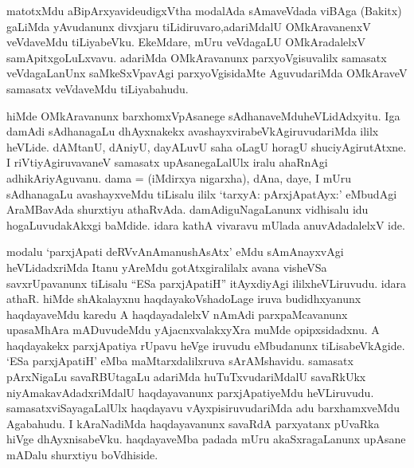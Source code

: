 \begin{artha}
matotxMdu aBipArxyavide\ndash  udigxVtha modalAda sAmaveVdada viBAga (Bakitx) gaLiMda yAvudanunx divxjaru tiLidiruvaro,\break adariMdalU OMkAravanenxV veVdaveMdu tiLiyabeVku. EkeMdare, mUru veVdagaLU OMkAradalelxV samApitxgoLuLxvavu. adariMda OMkAravanunx parxyoVgisuvalilx samasatx veVdagaLanUnx saMkeSxVpavAgi parxyoVgisidaMte AguvudariMda OMkAraveV samasatx veVdaveMdu tiLiyabahudu.
\end{artha}


\begin{artha}
hiMde OMkAravanunx barxhomxVpAsanege sAdhanaveMdu\break heVLidAdxyitu. Iga damAdi sAdhanagaLu dhAyxnakekx avashayxvirabeVkAgiruvudariMda ililx heVLide. dAMtanU, dAniyU, dayALuvU saha oLagU horagU shuciyAgirutAtxne. I riVtiyAgiruvavaneV samasatx upAsanegaLalUlx iralu ahaRnAgi adhikAriyAguvanu. dama = (iMdirxya nigarxha), dAna, daye, I mUru sAdhanagaLu avashayxveMdu tiLisalu ililx `tarxyA: pArxjApatAyx:' eMbudAgi AraMBavAda shurxtiyu athaRvAda. damAdiguNagaLanunx vidhisalu idu hogaLuvudakAkxgi baMdide. idara kathA vivaravu mUlada anuvAdadalelxV ide.
\end{artha}


\begin{artha}
modalu `parxjApati deRVvAnAmanushAsAtx' eMdu sAmAnayxvAgi heVLidadxriMda Itanu yAreMdu gotAtxgiralilalx avana visheVSa savxrUpavanunx tiLisalu ``ESa parxjApatiH'' itAyxdiyAgi ililx\break heVLiruvudu. idara athaR. hiMde shAkalayxnu haqdayakoVshadoLage iruva budidhxyanunx haqdayaveMdu karedu A haqdayadalelxV nAmAdi parxpaMcavanunx upasaMhAra mADuvudeMdu yAjacnxvalakxyXra muMde opipxsidadxnu. A haqdayakekx parxjApatiya rUpavu heVge iruvudu eMbudanunx tiLisabeVkAgide. `ESa parxjApatiH' eMba maMtarxdalilxruva sArAMshavidu. samasatx pArxNigaLu savaRBUtagaLu adariMda huTuTxvudariMdalU savaRkUkx niyAmakavAdadxriMdalU haqdayavanunx parxjApatiyeMdu heVLiruvudu. samasatxviSayagaLalUlx haqdayavu vAyxpisiruvudariMda adu barxhamxveMdu Agabahudu. I kAraNadiMda haqdayavanunx savaRdA parxyatanx pUvaRka hiVge dhAyxnisabeVku. haqdayaveMba padada mUru akaSxragaLanunx upAsane mADalu shurxtiyu boVdhiside.
\end{artha}

